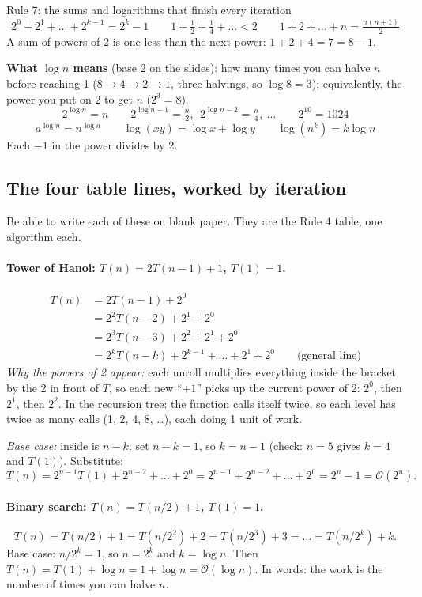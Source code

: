 \documentclass{fkt-notes}
\newcommand{\Oh}{\mathcal{O}}
\begin{document}
\begin{rulebox}{Rule 7: the sums and logarithms that finish every iteration}
\[
2^0+2^1+\dots+2^{k-1}=2^k-1 \qquad
1+\tfrac12+\tfrac14+\dots<2 \qquad
1+2+\dots+n=\tfrac{n(n+1)}2
\]
A sum of powers of 2 is one less than the next power: $1+2+4=7=8-1$.

\smallskip
\textbf{What $\log n$ means} (base 2 on the slides): how many times you can halve $n$ before reaching 1 ($8\to4\to2\to1$, three halvings, so $\log 8=3$); equivalently, the power you put on 2 to get $n$ ($2^3=8$).
\[
2^{\log n}=n \qquad 2^{\log n-1}=\tfrac n2,\ \ 2^{\log n-2}=\tfrac n4,\ \dots \qquad 2^{10}=1024
\]
\[
a^{\log n}=n^{\log a} \qquad \log(xy)=\log x+\log y \qquad \log(n^k)=k\log n
\]
Each $-1$ in the power divides by 2.
\end{rulebox}

\subsection{The four table lines, worked by iteration}

Be able to write each of these on blank paper. They are the Rule 4 table, one algorithm each.

\paragraph{Tower of Hanoi: $T(n)=2T(n-1)+1$, $T(1)=1$.}
\begin{align*}
T(n) &= 2T(n-1)+2^0\\
     &= 2^2T(n-2)+2^1+2^0\\
     &= 2^3T(n-3)+2^2+2^1+2^0\\
     &= 2^kT(n-k)+2^{k-1}+\dots+2^1+2^0 \qquad\text{(general line)}
\end{align*}
\emph{Why the powers of 2 appear:} each unroll multiplies everything inside the bracket by the 2 in front of $T$, so each new ``$+1$'' picks up the current power of 2: $2^0$, then $2^1$, then $2^2$. In the recursion tree: the function calls itself twice, so each level has twice as many calls (1, 2, 4, 8, \dots), each doing 1 unit of work.

\emph{Base case:} inside is $n-k$; set $n-k=1$, so $k=n-1$ (check: $n=5$ gives $k=4$ and $T(1)$). Substitute:
\[
T(n)=2^{n-1}T(1)+2^{n-2}+\dots+2^0=2^{n-1}+2^{n-2}+\dots+2^0=2^n-1=\Oh(2^n).
\]

\paragraph{Binary search: $T(n)=T(n/2)+1$, $T(1)=1$.}
\[
T(n)=T(n/2)+1=T(n/2^2)+2=T(n/2^3)+3=\dots=T(n/2^k)+k.
\]
Base case: $n/2^k=1$, so $n=2^k$ and $k=\log n$. Then $T(n)=T(1)+\log n=1+\log n=\Oh(\log n)$. In words: the work is the number of times you can halve $n$.
\end{document}
